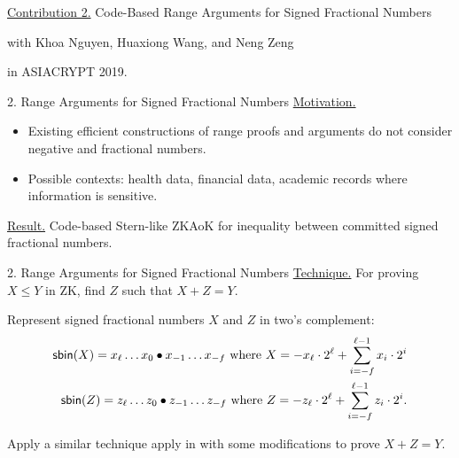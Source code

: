 \begin{frame}
	\underline{Contribution 2.} Code-Based Range Arguments for Signed Fractional Numbers
	
	{\small with Khoa Nguyen, Huaxiong Wang, and Neng Zeng}
	
	in ASIACRYPT 2019.
\end{frame}

\begin{frame}{2. Range Arguments for Signed Fractional Numbers}
	\underline{Motivation.} 
	\begin{itemize}
		\item Existing efficient constructions of range proofs and arguments do not consider negative and fractional numbers.
		\item Possible contexts: health data, financial data, academic records where information is sensitive.
	\end{itemize}

	\underline{Result.} Code-based Stern-like ZKAoK for inequality between committed signed fractional numbers.
	
\end{frame}

\begin{frame}{2. Range Arguments for Signed Fractional Numbers}
	\underline{Technique.} For proving $X \leq Y$ in ZK, find $Z$ such that $X + Z = Y$.
	
	Represent signed fractional numbers $X$ and $Z$ in two's complement:
	\begin{align*}
		\mathsf{sbin}(X) = x_\ell \dots x_0\bullet x_{-1}\dots x_{-f} \text{ where } X = -x_\ell \cdot 2^{\ell} + \sum_{i = -f}^{\ell-1} x_i\cdot 2^i\\ 
		\mathsf{sbin}(Z) = z_\ell \dots z_0\bullet z_{-1}\dots z_{-f} \text{ where } Z = -z_\ell \cdot 2^{\ell} + \sum_{i = -f}^{\ell-1} z_i\cdot 2^i.
	\end{align*}

	Apply a similar technique apply in \cite{LibertLNW18} with some modifications to prove $X + Z = Y$.
\end{frame}